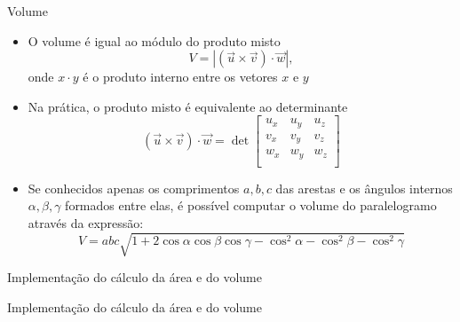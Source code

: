\begin{frame}[fragile]{Volume}

    \begin{itemize}
        \item O volume é igual ao módulo do produto misto 
        \[
            V = |(\vec{u} \times \vec{v}) \cdot \vec{w}|,
        \]
        onde $x\cdot y$ é o produto interno entre os vetores $x$ e $y$

        \item Na prática, o produto misto é equivalente ao determinante 
        \[
            (\vec{u} \times \vec{v}) \cdot \vec{w}
            = \det \begin{bmatrix}
                u_x & u_y & u_z \\
                v_x & v_y & v_z \\
                w_x & w_y & w_z \\
            \end{bmatrix}
        \]

        \item Se conhecidos apenas os comprimentos $a, b, c$ das arestas e os ângulos internos
            $\alpha, \beta, \gamma$ formados entre elas, é possível computar o volume do paralelogramo
                através da expressão:
            \[
                V = abc\sqrt{1 + 2\cos \alpha \cos \beta \cos \gamma - \cos^2 \alpha - \cos^2 \beta - \cos^2 \gamma}
            \]

    \end{itemize}

\end{frame}

\begin{frame}[fragile]{Implementação do cálculo da área e do volume}
\end{frame}

\begin{frame}[fragile]{Implementação do cálculo da área e do volume}
\end{frame}

